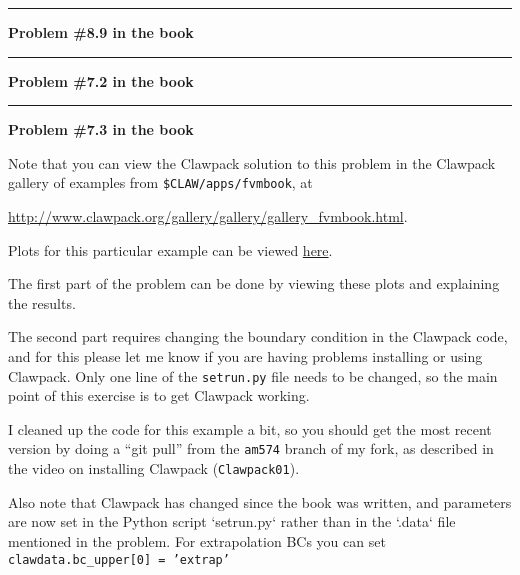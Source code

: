 \documentclass[11pt]{article}
\begin{document}



\vskip 1cm
\hrule
{\bf Problem \#8.9 in the book}



\vskip 1cm
\hrule
{\bf Problem \#7.2 in the book}




\vskip 1cm
\hrule
{\bf Problem \#7.3 in the book}

Note that you can view the Clawpack solution to this problem in the Clawpack gallery of examples from {\tt \$CLAW/apps/fvmbook}, at

\url{http://www.clawpack.org/gallery/gallery/gallery_fvmbook.html}.

Plots for this particular example can be viewed \href{http://www.clawpack.org/gallery/_static/apps/fvmbook/chap7/standing/_plots/_PlotIndex.html}{here}.

The first part of the problem can be done by viewing these plots and explaining the results.

The second part requires changing the boundary condition in the Clawpack code, and for this please let me know if you are having problems installing or using Clawpack.  Only one line of the {\tt setrun.py} file needs to be changed, so the main point of this exercise is to get Clawpack working.

I cleaned up the code for this example a bit, so you should get the most recent version by doing a ``git pull'' from the {\tt am574} branch of my fork, as described in the video on installing Clawpack ({\tt Clawpack01}).

Also note that Clawpack has changed since the book was written, and parameters are now set in the Python script `setrun.py` rather than in the `.data` file mentioned in the problem. For extrapolation BCs you can set \\
{\tt clawdata.bc\_upper[0] = 'extrap'}
\end{document}
